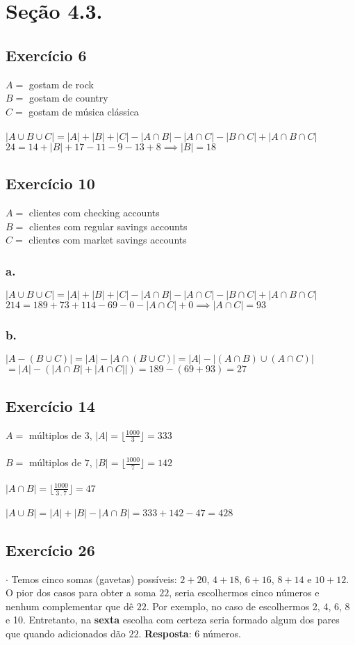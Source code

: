 \documentclass[12pt,a4paper]{article}
\begin{document}
\section*{Seção 4.3.}
\subsection*{Exercício 6}
$A =$ gostam de rock \\
$B =$ gostam de country \\
$C =$ gostam de música clássica \\ \\
$|A \cup B \cup C| = |A|+|B|+|C| - |A\cap B| - |A\cap C| -|B\cap C| + |A\cap B\cap C|$ \\
$24 = 14 + |B| + 17 - 11 - 9 - 13  + 8 \implies |B| = 18$

\subsection*{Exercício 10}
$A=$ clientes com checking accounts \\
$B=$ clientes com regular savings accounts \\
$C=$ clientes com market savings accounts
\subsubsection*{a.}
$|A \cup B \cup C| = |A|+|B|+|C| - |A\cap B| - |A\cap C| -|B\cap C| + |A\cap B\cap C|$ \\
$214 = 189 + 73 + 114 - 69 - 0 - |A\cap C|  + 0 \implies |A\cap C| = 93$
\subsubsection*{b.}
$|A-(B\cup C)| = |A| - |A\cap(B\cup C)| = |A| - |(A\cap B) \cup (A\cap C)|$ \\
$= |A| - (|A\cap B| + |A\cap C||) = 189 - (69+93) = 27 $
\subsection*{Exercício 14}
$A =$ múltiplos de $3$, \quad $|A| =\lfloor \frac{1000}{3}\rfloor = 333 $ \\ \\
$B =$ múltiplos de $7$, \quad $|B| =\lfloor \frac{1000}{7}\rfloor = 142 $ \\ \\
$|A\cap B| = \lfloor \frac{1000}{3\,.\,7}\rfloor = 47$ \\ \\
$|A\cup B| = |A| +|B| - |A\cap B| = 333+142-47=428  $
\subsection*{Exercício 26}
$\cdot$ Temos cinco somas (gavetas) possíveis: $2+20$, $4+18$, $6+16$, $8+14$ e $10+12$. O pior dos casos para obter a soma $22$, seria escolhermos cinco números e nenhum complementar que dê $22$. Por exemplo, no caso de escolhermos 2, 4, 6, 8 e 10. Entretanto, na \textbf{sexta} escolha com certeza seria formado algum dos pares que quando adicionados dão $22$. \textbf{Resposta}: $6$ números.
\end{document}
